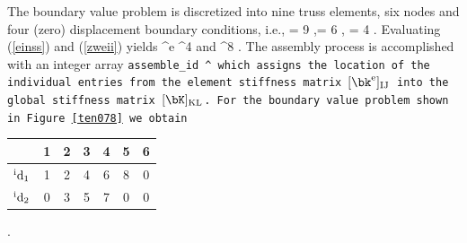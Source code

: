 The boundary value problem is discretized into nine truss elements, six nodes 
and four (zero) displacement boundary conditions, i.e.,
\ebn 
\numele = 9  ,\quad \numnodes = 6  ,  \quad\numdbc = 4  .
\een
Evaluating (\ref{einss}) and (\ref{zweii}) yields
\ebn
\rm
\underline \bk^e \in \IR^{4 } \quad and \quad \underline \bK \in \IR^{8 } .
\een
The assembly process is accomplished with an integer array
\ebn
\tt assemble_{id} \in \IR^{\dofnodes \times \numnodes}
\een
which assigns the location of the individual entries from the element
stiffness matrix $\rm [\bk^e]_{IJ}$ into the global stiffness matrix $\rm [\bK]_{KL}$.
For the boundary value problem shown in Figure \ref{ten078} we obtain

\begin{center}
\renewcommand{\arraystretch}{2}
\begin{tabular}{|@{\hspace{0.1cm}}A@{\hspace{0.1cm}}|B|B|B|B|B|B|}
\hline {}
 & \hspace{0.2cm} 1 \hspace{0.2cm} & \hspace{0.2cm} 2 \hspace{0.2cm} & \hspace{0.2cm} 3 \hspace{0.2cm} 
& \hspace{0.2cm} 4 \hspace{0.2cm} & \hspace{0.2cm} 5 \hspace{0.2cm} & \hspace{0.2cm} 6 \hspace{0.2cm} \\
\hline
$\rm {{}^i} d_{1}$ &1&2&4&6&8&0\\ 
\hline
$\rm {{}^i} d_{2}$ &0&3&5&7&0&0\\
\hline
\end{tabular}
.
\end{center}

